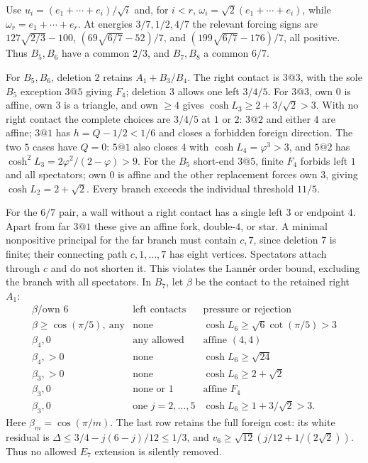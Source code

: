 \documentclass[11pt]{article}
\theoremstyle{definition}
\theoremstyle{remark}
\newcommand{\ph}{\varphi}
\begin{document}
Use $u_i=(e_1+\cdots+e_i)/\sqrt i$ and, for $i<r$,
$\omega_i=\sqrt2(e_1+\cdots+e_i)$, while
$\omega_r=e_1+\cdots+e_r$.
At energies $3/7,1/2,4/7$ the relevant forcing signs are
$127\sqrt{2/3}-100$, $(69\sqrt{6/7}-52)/7$, and
$(199\sqrt{6/7}-176)/7$, all positive.
Thus $B_5,B_6$ have a common $2/3$, and $B_7,B_8$ a common $6/7$.

For $B_5,B_6$, deletion $2$ retains $A_1+B_3/B_4$.
The right contact is $3@3$, with the sole $B_5$ exception $3@5$
giving $F_4$; deletion $3$ allows one left $3/4/5$.
For $3@3$, own $0$ is affine, own $3$ is a triangle, and own
$\ge4$ gives $\cosh L_3\ge2+3/\sqrt2>3$.
With no right contact the complete choices are $3/4/5$ at $1$ or
$2$: $3@2$ and either $4$ are affine; $3@1$ has
$h=Q-1/2<1/6$ and closes a forbidden foreign direction.
The two $5$ cases have $Q=0$: $5@1$ also closes $4$ with
$\cosh L_4=\ph^3>3$, and $5@2$ has
$\cosh^2L_3=2\ph^2/(2-\ph)>9$.
For the $B_5$ short-end $3@5$, finite $F_4$ forbids left $1$
and all spectators; own $0$ is affine and the other replacement
forces own $3$, giving $\cosh L_2=2+\sqrt2$.
Every branch exceeds the individual threshold $11/5$.

For the $6/7$ pair, a wall without a right contact has a single
left $3$ or endpoint $4$. Apart from far $3@1$ these give an
affine fork, double-$4$, or star. A minimal nonpositive principal
for the far branch must contain $c,7$, since deletion $7$ is
finite; their connecting path $c,1,\ldots,7$ has eight vertices.
Spectators attach through $c$ and do not shorten it. This violates
the Lann\'er order bound, excluding the branch with all spectators.
In $B_7$, let $\beta$ be the contact to the retained right $A_1$:
\[
\begin{array}{c|l|l}
\beta/\text{own }6&\text{left contacts}&\text{pressure or rejection}\\ \hline
\beta\ge\cos(\pi/5),\ \text{any}&\text{none}&\cosh L_6\ge\sqrt6\cot(\pi/5)>3\\
\beta_4,0&\text{any allowed}&\text{affine }(4,4)\\
\beta_4,>0&\text{none}&\cosh L_6\ge\sqrt{24}\\
\beta_3,>0&\text{none}&\cosh L_6\ge2+\sqrt2\\
\beta_3,0&\text{none or }1&\text{affine }F_4\\
\beta_3,0&\text{one }j=2,\ldots,5&\cosh L_6\ge1+3/\sqrt2>3.
\end{array}
\]
Here $\beta_m=\cos(\pi/m)$. The last row retains the full foreign
cost: its white residual is
$\Delta\le3/4-j(6-j)/12\le1/3$, and
$v_6\ge\sqrt{12}(j/12+1/(2\sqrt2))$.
Thus no allowed $E_7$ extension is silently removed.
\end{document}
